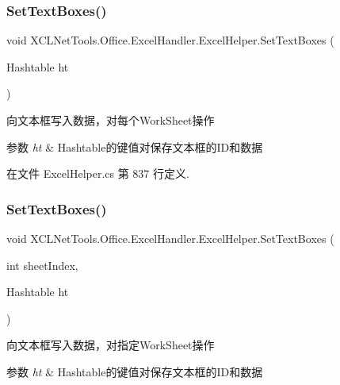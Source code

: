 \subsubsection{\texorpdfstring{Set\+Text\+Boxes()}{SetTextBoxes()}\hspace{0.1cm}{\footnotesize\ttfamily [1/2]}}
{\footnotesize\ttfamily void X\+C\+L\+Net\+Tools.\+Office.\+Excel\+Handler.\+Excel\+Helper.\+Set\+Text\+Boxes (\begin{DoxyParamCaption}\item[{Hashtable}]{ht }\end{DoxyParamCaption})}



向文本框写入数据，对每个\+Work\+Sheet操作 


\begin{DoxyParams}{参数}
{\em ht} & Hashtable的键值对保存文本框的\+I\+D和数据\\
\hline
\end{DoxyParams}


在文件 Excel\+Helper.\+cs 第 837 行定义.

\mbox{\label{class_x_c_l_net_tools_1_1_office_1_1_excel_handler_1_1_excel_helper_afcac92ace2a349e193920ad28101dd0e}} 
\subsubsection{\texorpdfstring{Set\+Text\+Boxes()}{SetTextBoxes()}\hspace{0.1cm}{\footnotesize\ttfamily [2/2]}}
{\footnotesize\ttfamily void X\+C\+L\+Net\+Tools.\+Office.\+Excel\+Handler.\+Excel\+Helper.\+Set\+Text\+Boxes (\begin{DoxyParamCaption}\item[{int}]{sheet\+Index,  }\item[{Hashtable}]{ht }\end{DoxyParamCaption})}



向文本框写入数据，对指定\+Work\+Sheet操作 


\begin{DoxyParams}{参数}
{\em ht} & Hashtable的键值对保存文本框的\+I\+D和数据\\
\hline
\end{DoxyParams}


